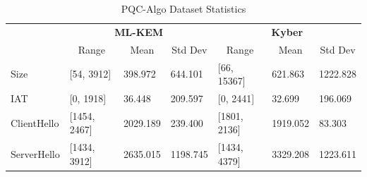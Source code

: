 \documentclass[10pt,journal]{IEEEtran}%
\DeclareRobustCommand{\hlorange}[1]{{\sethlcolor{orange}\hl{#1}}}
\begin{document}
\begin{table}[]
\caption{PQC-Algo Dataset Statistics}
\label{tab:algo-stats}
\centering
\begin{tabular}{l|lll|lll|}
\cline{2-7}
                                  & \multicolumn{3}{c|}{\textbf{ML-KEM}}                                                                      & \multicolumn{3}{c|}{\textbf{Kyber}}                                                                          \\ \cline{2-7} 
                                  & \multicolumn{1}{c|}{Range}            & \multicolumn{1}{c|}{Mean}     & \multicolumn{1}{c|}{Std Dev} & \multicolumn{1}{c|}{Range}               & \multicolumn{1}{c|}{Mean}     & \multicolumn{1}{c|}{Std Dev} \\ \hline
\multicolumn{1}{|l|}{Size}        & \multicolumn{1}{l|}{{[}54, 3912{]}}   & \multicolumn{1}{l|}{398.972}  & 644.101                  & \multicolumn{1}{l|}{{[}66, 15367{]}} & \multicolumn{1}{l|}{621.863}  & 1222.828                 \\ \hline
\multicolumn{1}{|l|}{IAT}         & \multicolumn{1}{l|}{{[}0, 1918{]}}    & \multicolumn{1}{l|}{36.448}   & 209.597                  & \multicolumn{1}{l|}{{[}0, 2441{]}}     & \multicolumn{1}{l|}{32.699}   & 196.069                  \\ \hline
\multicolumn{1}{|l|}{ClientHello} & \multicolumn{1}{l|}{{[}1454, 2467{]}} & \multicolumn{1}{l|}{2029.189} & 239.400                  & \multicolumn{1}{l|}{{[}1801, 2136{]}}    & \multicolumn{1}{l|}{1919.052} & 83.303                   \\ \hline
\multicolumn{1}{|l|}{ServerHello} & \multicolumn{1}{l|}{{[}1434, 3912{]}} & \multicolumn{1}{l|}{2635.015} & 1198.745                 & \multicolumn{1}{l|}{{[}1434, 4379{]}}    & \multicolumn{1}{l|}{3329.208} & 1223.611                 \\ \hline
\end{tabular}
\end{table}
\end{document}
